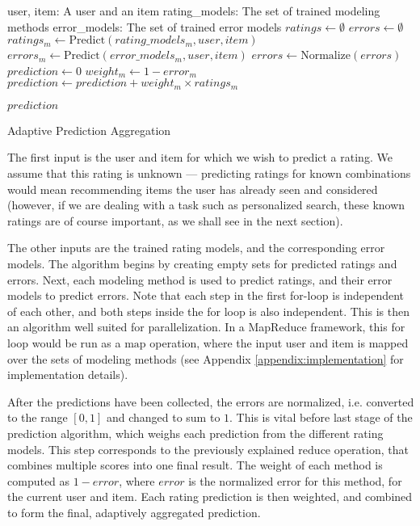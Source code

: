 \begin{algorithm}
  \begin{algorithmic}[1]
  \REQUIRE user, item: A user and an item
  \REQUIRE rating\_models: The set of trained modeling methods 
  \REQUIRE error\_models: The set of trained error models
  \ENSURE
    \STATE $ratings \gets \emptyset$
    \STATE $errors  \gets \emptyset$
      \STATE $ratings_{m} \gets \mathrm{Predict}(rating\_models_m, user, item)$
      \STATE $errors_{m}  \gets \mathrm{Predict}(error\_models_m, user, item)$
    \ENDFOR 
    \STATE $errors \gets \mathrm{Normalize}(errors)$
    \STATE $prediction \gets 0$
      \STATE $weight_m \gets 1 - error_m$
      \STATE $prediction \gets prediction + weight_m \times ratings_m$
    \ENDFOR
 
  \RETURN $prediction$
  \end{algorithmic}
  \caption[Adaptive Prediction Aggregation]{Adaptive Prediction Aggregation
  }
  \label{code:prediction}
\end{algorithm}

The first input is the user and item for which we wish to predict a rating.
We assume that this rating is unknown --- predicting ratings for known combinations
would mean recommending items the user has already seen and considered
(however, if we are dealing with a task such as personalized search,
these known ratings are of course important, as we shall see in the next section).

The other inputs are the trained rating models, and the corresponding error models.
The algorithm begins by creating empty sets for predicted ratings and errors.
Next, each modeling method is used to predict ratings, and their error models to predict errors.
Note that each step in the first for-loop is independent of each other, and both steps
inside the for loop is also independent. This is then an algorithm well suited for
parallelization.
In a MapReduce framework, this for loop would be run as a $\mathrm{map}$ operation,
where the input user and item is mapped over the sets of modeling methods
(see Appendix \ref{appendix:implementation} for implementation details).

After the predictions have been collected, the errors are normalized,
i.e. converted to the range $[0,1]$ and changed to sum to $1$.
This is vital before last stage of the prediction algorithm,
which weighs each prediction from the different rating models.
This step corresponds to the previously explained $\mathrm{reduce}$ operation,
that combines multiple scores into one final result.
The weight of each method is computed as $1 - error$, where $error$ 
is the normalized error for this method, for the current user and item.
Each rating prediction is then weighted, and combined to form the final,
adaptively aggregated prediction.

